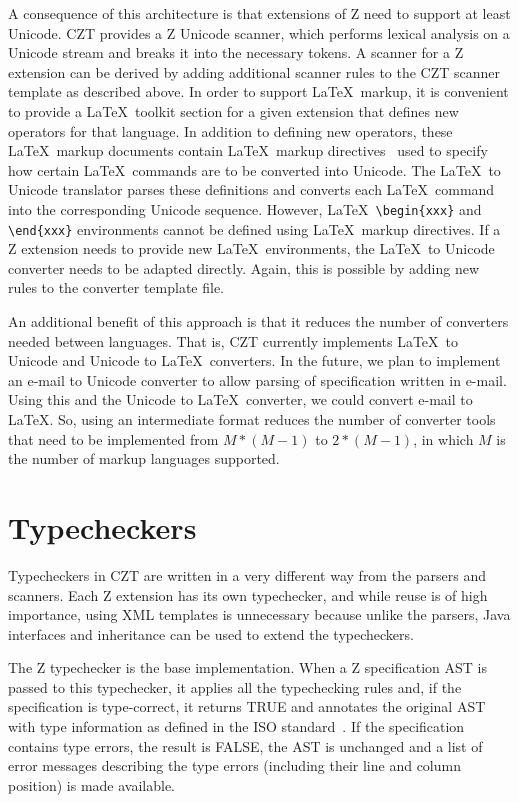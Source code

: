\documentclass{llncs}
\begin{document}
A consequence of this architecture is that extensions of Z need
to support at least Unicode.  CZT provides a Z Unicode scanner, which
performs lexical analysis on a Unicode stream and breaks it into the
necessary tokens.  A scanner for a Z extension can be derived by
adding additional scanner rules to the CZT scanner template as
described above.  In order to support \LaTeX\ markup, it is convenient
to provide a \LaTeX\ toolkit section for a given extension that
defines new operators for that language.  In
addition to defining new operators, these \LaTeX\ markup documents
contain \LaTeX\ markup directives~\cite{isoz,czt} used to specify how
certain \LaTeX\ commands are to be converted into Unicode.  The
\LaTeX\ to Unicode translator parses these definitions and converts
each \LaTeX\ command into the corresponding Unicode sequence.
However, \LaTeX\ \verb+\begin{xxx}+ and \verb+\end{xxx}+ environments
cannot be defined using \LaTeX\ markup directives.  If a Z extension
needs to provide new \LaTeX\ environments, the \LaTeX\ to Unicode converter
needs to be adapted directly.  Again, this is possible by adding new
rules to the converter template file.

An additional benefit of this approach is that it reduces the number
of converters needed between languages. That is, CZT currently
implements \LaTeX\ to Unicode and Unicode to \LaTeX\ converters. In
the future, we plan to implement an e-mail to Unicode converter to
allow parsing of specification written in e-mail. Using this and the
Unicode to \LaTeX\ converter, we could convert e-mail to \LaTeX. So,
using an intermediate format reduces the number of converter tools
that need to be implemented from $M*(M-1)$ to $2*(M-1)$, in which $M$
is the number of markup languages supported.


\section{Typecheckers}
\label{typecheckers}

Typecheckers in CZT are written in a very different way from the parsers
and scanners. Each Z extension has its own typechecker, and while reuse
is of high importance, using XML templates is unnecessary because
unlike the parsers, Java interfaces and inheritance can be used to
extend the typecheckers.

The Z typechecker is the base implementation.  When a Z specification
AST is passed to this typechecker, it applies all the typechecking
rules and, if the specification is type-correct, it returns TRUE and
annotates the original AST with type information as defined in the ISO
standard~\cite[Section~10]{isoz}.  If the specification contains type errors,
the result is FALSE, the AST is unchanged and a list of error messages
describing the type errors (including their line and column position)
is made available.
\end{document}
